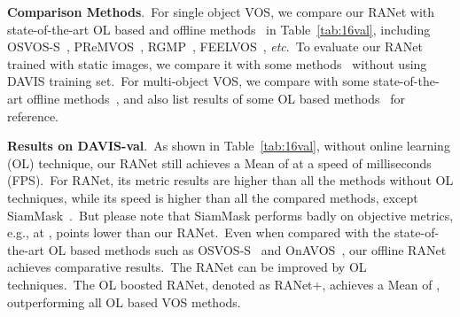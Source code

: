 \documentclass[10pt,twocolumn,letterpaper]{article}
\begin{document}
\noindent
\textbf{Comparison Methods}.\ For single object VOS, we compare our RANet with  state-of-the-art OL based and  offline methods~\cite{osvos-s,masktrack,osvos,cinm,onavos,premvos,plm,vpn,siammask,ctn,osmn,sfl,pml,videomatch,favos,Voigtlaender2019FEELVOS,rgmp} in Table~\ref{tab:16val}, including OSVOS-S~\cite{osvos-s}, PReMVOS~\cite{premvos}, RGMP~\cite{rgmp}, FEELVOS~\cite{Voigtlaender2019FEELVOS}, \textit{etc}.\ To evaluate our RANet trained with static images, we compare it with some methods~\cite{bvs,ofl,vpn,ctn,masktrack} without using DAVIS training set.\ For multi-object VOS, we compare with some state-of-the-art offline methods~\cite{osvos,onavos,favos,osmn,videomatch}, and also list results of some OL based methods~\cite{cinm,osvos-s,onavos,osvos,videomatch} for reference.



\noindent
\textbf{Results on DAVIS-val}.\ As shown in Table~\ref{tab:16val}, without online learning (OL) technique, our RANet still achieves a  Mean of  at a speed of  milliseconds (FPS).\ For RANet, its metric results are higher than all the methods without OL techniques, while its speed is higher than all the compared methods, except SiamMask~\cite{siammask}.\ But please note that SiamMask performs badly on objective metrics, e.g.,  at ,  points lower than our RANet.\ Even when compared with the state-of-the-art OL based methods such as OSVOS-S~\cite{osvos-s} and OnAVOS~\cite{onavos}, our offline RANet achieves comparative results.\ The RANet can be improved by OL techniques.\ The OL boosted RANet, denoted as RANet+, achieves a  Mean of , outperforming all OL based VOS methods.  
\end{document}
